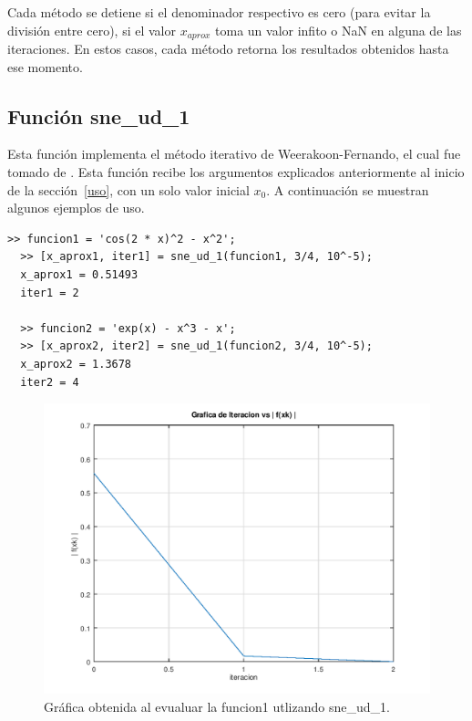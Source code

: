 \documentclass[12pt]{article}
\begin{document}
Cada método se detiene si el denominador respectivo es cero (para evitar la división entre cero), si el valor $x_{aprox}$ toma un valor infito o NaN en alguna de las iteraciones. En estos casos, cada método retorna los resultados obtenidos hasta ese momento.

\subsection{Función sne\_ud\_1}
Esta función implementa el método iterativo de Weerakoon-Fernando, el cual fue tomado de \cite{kiran2015performance}. Esta función recibe los argumentos explicados anteriormente al inicio de la sección~\ref{uso}, con un solo valor inicial $x_{0}$. A continuación se muestran algunos ejemplos de uso.

\begin{minipage}{\linewidth}
\begin{lstlisting}[frame = single]
  >> funcion1 = 'cos(2 * x)^2 - x^2';
  >> [x_aprox1, iter1] = sne_ud_1(funcion1, 3/4, 10^-5);
  x_aprox1 = 0.51493
  iter1 = 2

  >> funcion2 = 'exp(x) - x^3 - x';
  >> [x_aprox2, iter2] = sne_ud_1(funcion2, 3/4, 10^-5);
  x_aprox2 = 1.3678
  iter2 = 4

\end{lstlisting}
\end{minipage}

\begin{figure}
  \includegraphics[width=12cm]{sne_ud_1_octave.png}
  \centering
  \caption{Gráfica obtenida al evualuar la funcion1 utlizando sne\_ud\_1.}
  \label{fig:wf-1}
\end{figure}
\end{document}
